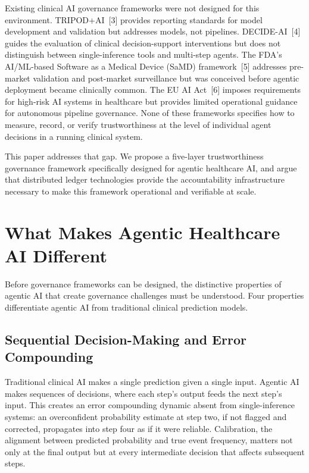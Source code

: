 \documentclass[11pt]{article}
\begin{document}
Existing clinical AI governance frameworks were not designed for this
environment. TRIPOD+AI~{[}3{]} provides reporting standards for model
development and validation but addresses models, not pipelines.
DECIDE-AI~{[}4{]} guides the evaluation of clinical decision-support
interventions but does not distinguish between single-inference tools
and multi-step agents. The FDA's AI/ML-based Software as a Medical
Device (SaMD) framework~{[}5{]} addresses pre-market validation and
post-market surveillance but was conceived before agentic deployment
became clinically common. The EU AI Act~{[}6{]} imposes requirements for
high-risk AI systems in healthcare but provides limited operational
guidance for autonomous pipeline governance. None of these frameworks
specifies how to measure, record, or verify trustworthiness at the level
of individual agent decisions in a running clinical system.

This paper addresses that gap. We propose a five-layer trustworthiness
governance framework specifically designed for agentic healthcare AI,
and argue that distributed ledger technologies provide the
accountability infrastructure necessary to make this framework
operational and verifiable at scale.


\section{What Makes Agentic Healthcare AI
Different}\label{what-makes-agentic-healthcare-ai-different}

Before governance frameworks can be designed, the distinctive properties
of agentic AI that create governance challenges must be understood. Four
properties differentiate agentic AI from traditional clinical prediction
models.

\subsection{Sequential Decision-Making and Error
Compounding}\label{sequential-decision-making-and-error-compounding}

Traditional clinical AI makes a single prediction given a single input.
Agentic AI makes sequences of decisions, where each step's output feeds
the next step's input. This creates an error compounding dynamic absent
from single-inference systems: an overconfident probability estimate at
step two, if not flagged and corrected, propagates into step four as if
it were reliable. Calibration, the alignment between predicted
probability and true event frequency, matters not only at the final
output but at every intermediate decision that affects subsequent steps.
\end{document}
